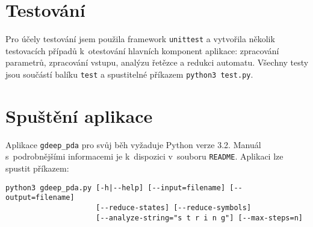 \section{Testování}

Pro účely testování jsem použila framework \texttt{unittest} a vytvořila několik testovacích případů k~otestování hlavních komponent aplikace: zpracování parametrů, zpracování vstupu, analýzu řetězce a redukci automatu. Všechny testy jsou součástí balíku \texttt{test} a spustitelné příkazem \texttt{python3 test.py}.

\section{Spuštění aplikace}

Aplikace \texttt{gdeep\_pda} pro svůj běh vyžaduje Python verze 3.2. Manuál s~podrobnějšími informacemi je k~dispozici v~souboru \texttt{README}. Aplikaci lze spustit příkazem:

\begin{verbatim}
python3 gdeep_pda.py [-h|--help] [--input=filename] [--output=filename] 
                     [--reduce-states] [--reduce-symbols] 
                     [--analyze-string="s t r i n g"] [--max-steps=n]
\end{verbatim} 










